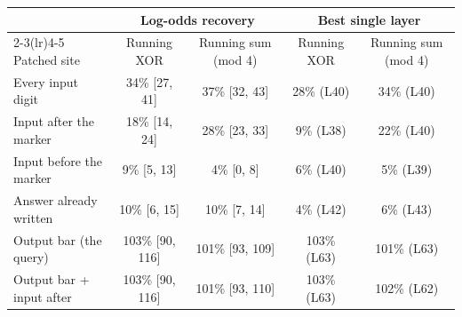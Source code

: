 \begin{tabular}{l cc cc}
\toprule
& \multicolumn{2}{c}{Log-odds recovery} & \multicolumn{2}{c}{Best single layer} \\
\cmidrule(lr){2-3}\cmidrule(lr){4-5}
Patched site & Running XOR & Running sum (mod 4) & Running XOR & Running sum (mod 4) \\
\midrule
Every input digit & 34\% [27, 41] & 37\% [32, 43] & 28\% (L40) & 34\% (L40) \\
Input after the marker & 18\% [14, 24] & 28\% [23, 33] & 9\% (L38) & 22\% (L40) \\
Input before the marker & 9\% [5, 13] & 4\% [0, 8] & 6\% (L40) & 5\% (L39) \\
Answer already written & 10\% [6, 15] & 10\% [7, 14] & 4\% (L42) & 6\% (L43) \\
Output bar (the query) & 103\% [90, 116] & 101\% [93, 109] & 103\% (L63) & 101\% (L63) \\
Output bar + input after & 103\% [90, 116] & 101\% [93, 110] & 103\% (L63) & 102\% (L62) \\
\bottomrule
\end{tabular}
